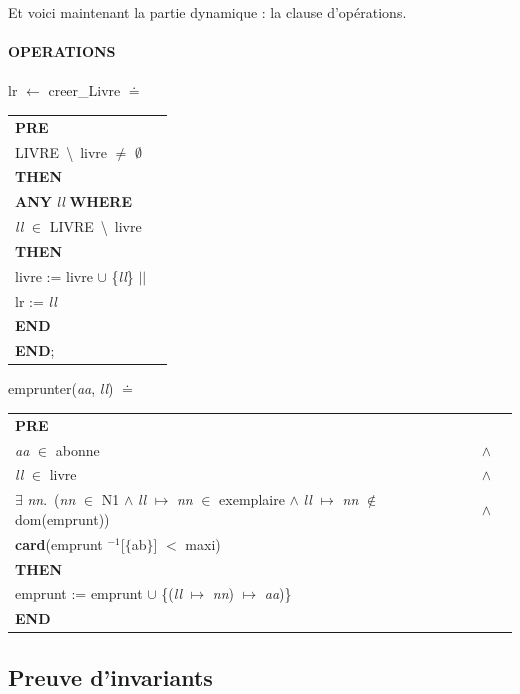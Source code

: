 \documentclass[10pt,a4paper]{article}
\begin{document}
Et voici maintenant la partie dynamique : la clause d'opérations.
\\
\\
\noindent \textbf{OPERATIONS}\\ \\
\indent lr $\leftarrow$ creer\_Livre $\doteq$
\begin{longtable}{ll} \textbf{PRE} \tabularnewline
\indent LIVRE\ \textbackslash \ livre $\neq$ $\emptyset$ \tabularnewline
\textbf{THEN} \tabularnewline
\indent \textbf{ANY} \emph{ll} \textbf{WHERE} \tabularnewline \indent \indent \emph{ll} $\in$ LIVRE\ \textbackslash \ livre \tabularnewline
\indent \textbf{THEN} \tabularnewline
\indent \indent livre := livre $\cup$ \{\emph{ll}\} $||$ \tabularnewline
\indent \indent lr := \emph{ll} \tabularnewline
\indent \textbf{END} \tabularnewline
\textbf{END};
\end{longtable}

\indent emprunter(\emph{aa}, \emph{ll}) $\doteq$
\begin{longtable}{lll}
\textbf{PRE} \tabularnewline
\indent \emph{aa} $\in$ abonne & $\wedge$ \tabularnewline 
\indent \emph{ll} $\in$ livre & $\wedge$ \tabularnewline
\indent $\exists$ \emph{nn}.\ (\emph{nn} $\in$ N1 $\wedge$ \emph{ll} $\mapsto$ \emph{nn} $\in$ exemplaire $\wedge$ \emph{ll} $\mapsto$ \emph{nn} $\notin$ dom(emprunt)) & $\wedge$ \tabularnewline
\indent \textbf{card}(emprunt $^{-1}$[$\{$ab$\}$] $<$ maxi) \tabularnewline
\textbf{THEN} \tabularnewline \indent emprunt := emprunt $\cup$ \{(\emph{ll} $\mapsto$ \emph{nn}) $\mapsto$ \emph{aa})\} \tabularnewline
\textbf{END} \tabularnewline
\end{longtable}

\setlength\LTleft{\fill}

\subsection{Preuve d'invariants}

\end{document}
